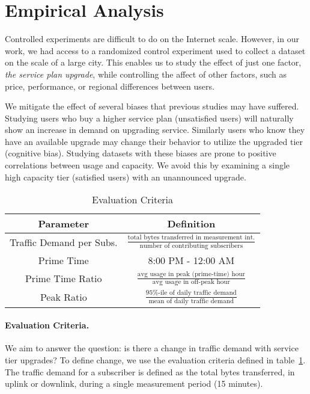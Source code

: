 \section{Empirical Analysis}\label{sec:analysis}


Controlled experiments are difficult to do on the Internet scale. However, in 
our work, we had access to a randomized control experiment used to collect a 
dataset on the scale of a large city. This enables us to study the effect of 
just one factor, \emph{the service plan upgrade}, while controlling the affect 
of other factors, such as price, performance, or regional differences between 
users.

We mitigate the effect of several biases that previous studies may have 
suffered. Studying users who buy a higher service plan (unsatisfied users) will 
naturally show an increase in demand on upgrading service. Similarly users who 
know they have an available upgrade may change their behavior to utilize the 
upgraded tier (cognitive bias). Studying datasets with these biases are prone 
to positive correlations between usage and capacity. We avoid this by examining 
a single high capacity tier (satisfied users) with an unannounced upgrade.

\begin{table}[t]
\small 
\begin{tabular}{| c | c |}\hline
\textbf{Parameter} & \textbf{Definition}	\\\hline
Traffic Demand per Subs.& \(\frac{\text{total bytes transferred in 
measurement int.}}{\text{number of contributing subscribers}}\)	\\
Prime Time		& 8:00 PM - 12:00 AM   		\\
Prime Time Ratio 	& \( \frac{ \text{avg usage in peak (prime-time) 
hour}}{ \text{avg usage in off-peak hour}}\) 		\\
Peak Ratio 		& \(\frac{\text{95\%-ile of daily traffic 
demand}}{\text{mean of daily traffic demand}}\)	\\\hline
\end{tabular}
\caption{Evaluation Criteria}
\label{tab:eval-criteria}
\end{table}


\paragraph{Evaluation Criteria. } We aim to answer the question: is there a 
change in traffic demand with service tier upgrades? To define change, we use 
the evaluation criteria defined in table~\ref{tab:eval-criteria}. The traffic 
demand for a subscriber is defined as the total bytes transferred, in 
uplink or downlink, during a single measurement period (15 minutes).

